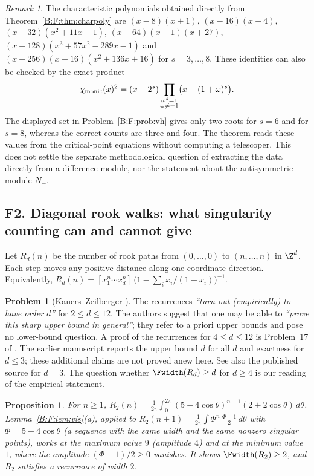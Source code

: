 \documentclass[11pt,a4paper]{article}
\newtheorem{proposition}[theorem]{Proposition}
\theoremstyle{definition}
\newtheorem{problem}[theorem]{Problem}
\theoremstyle{remark}
\newtheorem{remark}[theorem]{Remark}
\numberwithin{equation}{section}
\begin{document}
\begin{remark}\label{B:F:rem:vh-check}
The characteristic polynomials obtained directly from Theorem~\ref{B:F:thm:charpoly}
are $(x-8)(x+1)$, $(x-16)(x+4)$, $(x-32)(x^2+11x-1)$,
$(x-64)(x-1)(x+27)$, $(x-128)(x^3+57x^2-289x-1)$ and
$(x-256)(x-16)(x^2+136x+16)$ for $s=3,\ldots,8$.
These identities can also be checked by the exact product
\[
 \chi_{\rm monic}(x)^2=(x-2^s)
   \prod_{\substack{\omega^s=1\\\omega\ne-1}}
     \bigl(x-(1+\omega)^s\bigr).
\]
The displayed set in Problem~\ref{B:F:prob:vh} gives only two roots for
$s=6$ and for $s=8$, whereas the correct counts are three and four.
The theorem reads these values from the critical-point equations without
computing a telescoper. This does not settle the separate methodological
question of extracting the data directly from a difference module, nor the
statement about the antisymmetric module $N_-$.
\end{remark}

\subsection{F2. Diagonal rook walks: what singularity counting can and cannot give}\label{B:F:ssec:rook}

Let $R_d(n)$ be the number of rook paths from $(0,\dots,0)$ to
$(n,\dots,n)$ in $\Z^d$. Each step moves any positive distance along one
coordinate direction. Equivalently,
$R_d(n)=[x_1^n\cdots x_d^n]\,\bigl(1-\sum_ix_i/(1-x_i)\bigr)^{-1}$.

\begin{problem}[Kauers--Zeilberger {\cite[\S2]{R056}}]\label{B:F:prob:kz}
The recurrences \emph{``turn out (empirically) to have order $d$''} for
$2\le d\le12$. The authors suggest that one may be able to \emph{``prove this
sharp upper bound in general''}; they refer to a priori upper bounds and pose
no lower-bound question. A proof of the recurrences for $4\le d\le12$ is
Problem~17 of \cite{R057}. The earlier manuscript \cite{R022} reports the upper bound $d$ for all $d$ and exactness for $d\le3$; these additional claims are not proved anew here. See also the published source \cite{R058} for $d=3$. The question whether $\Fwidth(R_d)\ge d$ for
$d\ge4$ is our reading of the empirical statement.
\end{problem}

\begin{proposition}\label{B:F:prop:rook2}
For $n\ge1$,
$R_2(n)=\frac1{2\pi}\int_0^{2\pi}(5+4\cos\theta)^{n-1}(2+2\cos\theta)\,d\theta$.
Lemma~\ref{B:F:lem:vis}(a), applied to
$R_2(n+1)=\frac1{2\pi}\int\Phi^n\,\frac{\Phi-1}2\,d\theta$ with $\Phi=5+4\cos\theta$ (a
sequence with the same width and the same nonzero singular points), works at the
maximum value $9$ (amplitude $4$) and at the minimum value $1$, where the
amplitude $(\Phi-1)/2\ge0$ vanishes.
It shows $\Fwidth(R_2)\ge2$, and $R_2$ satisfies a recurrence of width $2$.
\end{proposition}
\end{document}
